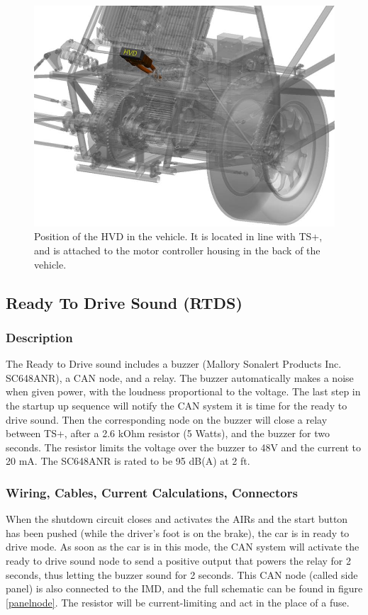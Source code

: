 \documentclass{article}
\begin{document}
        \begin{figure}[H]
            \centering
            \includegraphics[width = 0.6 \textwidth]{hvd_position}
            \caption{Position of the HVD in the vehicle. It is located in line with TS+, and is attached to the motor controller housing in the back of the vehicle. }
            \label{hvdlocation}
        \end{figure}

    \subsection{Ready To Drive Sound (RTDS)} \label{R2Dsection}

        \subsubsection{Description}

            The Ready to Drive sound includes a buzzer (Mallory Sonalert Products Inc. SC648ANR), a CAN node, and a relay. The buzzer automatically makes a noise when given power, with the loudness proportional to the voltage. The last step in the startup up sequence will notify the CAN system it is time for the ready to drive sound. Then the corresponding node on the buzzer will close a relay between TS+, after a 2.6 kOhm resistor (5 Watts), and the buzzer for two seconds. The resistor limits the voltage over the buzzer to 48V and the current to 20 mA. The SC648ANR is rated to be 95 dB(A) at 2 ft.

        \subsubsection{Wiring, Cables, Current Calculations, Connectors}

            When the shutdown circuit closes and activates the AIRs and the start button has been pushed (while the driver's foot is on the brake), the car is in ready to drive mode. As soon as the car is in this mode, the CAN system will activate the ready to drive sound node to send a positive output that powers the relay for 2 seconds, thus letting the buzzer sound for 2 seconds. This CAN node (called side panel) is also connected to the IMD, and the full schematic can be found in figure \ref{panelnode}. The resistor will be current-limiting and act in the place of a fuse.
\end{document}

